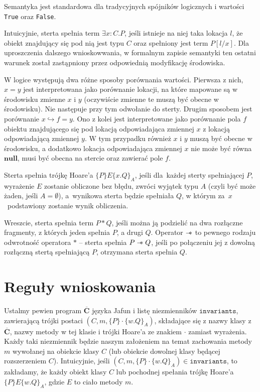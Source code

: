 \documentclass[]{pracamgr}
\newcommand \wand {\mathrel{-\mkern-6mu*}}
\newcommand \hoare [5] {\{#1\}#2\{#4.#5\}_#3}
\renewcommand \| {\hspace{0.75em} | \hspace{0.75em} }
\renewcommand \[ {[\![}
\renewcommand \] {]\!]}
\theoremstyle{definition}
\newcommand{\jnull}{\mathbf{null}\xspace}
\begin{document}
\vspace{2em}

Semantyka jest standardowa dla tradycyjnych spójników logicznych i wartości \texttt{True}
oraz \texttt{False}.

Intuicyjnie, sterta spełnia term $\exists x : C . P$, jeśli istnieje na niej taka lokacja $l$,
że obiekt znajdujący się pod nią jest typu $C$ oraz spełniony jest term $P[l/x]$.
Dla uproszczenia dalszego wnioskowwania, w formalnym zapisie semantyki ten ostatni warunek został
zastąpniony przez odpowiednią modyfikację środowiska.

W logice występują dwa różne sposoby porównania wartości. Pierwsza z nich, $x = y$ jest interpretowana
jako porównanie lokacji, na które mapowane są w środowisku zmienne $x$ i $y$
(oczywiście zmienne te muszą być obecne w środowisku).
Nie następuje przy tym odwołanie do sterty. Drugim sposobem jest porównanie
$x \hookrightarrow f = y$. Ono z kolei jest interpretowane jako porównanie pola $f$ obiektu znajdującego
się pod lokacją odpowiadająca zmiennej $x$ z lokacją odpowiadającą zmiennej $y$. W tym przypadku
również $x$ i $y$ muszą być obecne w środowisku, a dodatkowo lokacja odpowiadająca zmiennej $x$
nie może być równa $\jnull$, musi być obecna na stercie oraz zawierać pole $f$.

Sterta spełnia trójkę Hoare'a $\hoare{P}{E}{A}{x}{Q}$, jeśli dla~każdej sterty spełniającej
$P$, wyrażenie $E$ zostanie obliczone bez błędu, zwróci wyjątek typu $A$
(czyli być może żaden, jeśli $A = \emptyset$),
a~wynikowa sterta będzie
spełniała $Q$, w którym za~$x$~podstawiony zostanie wynik obliczenia.

Wreszcie, sterta spełnia term $P * Q$, jeśli można ją podzielić na dwa rozłączne fragmenty, z których
jeden spełnia $P$, a drugi $Q$.
Operator $\wand$ to pewnego rodzaju odwrotność operatora $*$ -- sterta spełnia $P \wand Q$, jeśli
po połączeniu jej z dowolną rozłączną stertą spełniającą $P$, otrzymana sterta spełnia $Q$.

\chapter{Reguły wnioskowania}
\label{chap:rules}
Ustalmy pewien program \(\overline{\mathbf{C}}\) języka Jafun i
listę niezmienników $\mathtt{invariants}$, zawierającą trójki postaci
$(C, m, \hoare{P}{\cdot}{A}{w}{Q})$, składające się z nazwy klasy z \(\overline{\mathbf{C}}\),
nazwy metody w tej klasie i trójki Hoare'a ze znakiem $\cdot$ zamiast wyrażenia.
Każdy taki niezmiennik będzie naszym założeniem na temat zachowania metody $m$ wywołanej na
obiekcie klasy $C$ (lub obiekcie dowolnej klasy będącej rozszerzeniem $C$).
Intuicyjnie, jeśli $(C, m, \hoare{P}{\cdot}{A}{w}{Q}) \in \mathtt{invariants}$,
to zakładamy, że każdy obiekt klasy $C$ lub pochodnej spełania trójkę Hoare'a
$\hoare{P}{E}{A}{w}{Q}$, gdzie $E$ to ciało metody $m$.
\end{document}

